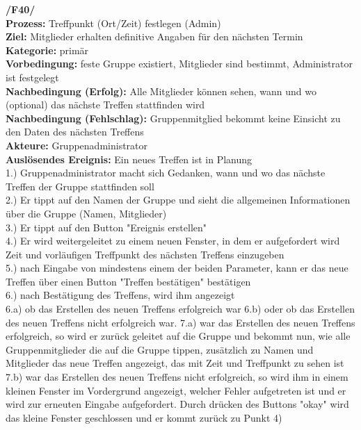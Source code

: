 \textbf{/F40/} \\
\textbf{Prozess:} Treffpunkt (Ort/Zeit) festlegen (Admin)\\
\textbf{Ziel:} Mitglieder erhalten definitive Angaben für den nächsten Termin\\
\textbf{Kategorie:} primär\\
\textbf{Vorbedingung:} feste Gruppe existiert, Mitglieder sind bestimmt, Administrator ist festgelegt\\
\textbf{Nachbedingung (Erfolg):} Alle Mitglieder können sehen, wann und wo (optional) das nächste Treffen stattfinden wird\\
\textbf{Nachbedingung (Fehlschlag):} Gruppenmitglied bekommt keine Einsicht zu den Daten des nächsten Treffens\\
\textbf{Akteure:} Gruppenadministrator\\
\textbf{Auslösendes Ereignis:} Ein neues Treffen ist in Planung\\
1.) Gruppenadministrator macht sich Gedanken, wann und wo das nächste Treffen der Gruppe stattfinden soll\\
2.) Er tippt auf den Namen der Gruppe und sieht die allgemeinen Informationen über die Gruppe (Namen, Mitglieder)\\
3.) Er tippt auf den Button "Ereignis erstellen"\\
4.) Er wird weitergeleitet zu einem neuen Fenster, in dem er aufgefordert wird Zeit und vorläufigen Treffpunkt des nächsten Treffens einzugeben\\
5.) nach Eingabe von mindestens einem der beiden Parameter, kann er das neue Treffen über einen Button "Treffen bestätigen" bestätigen\\
6.) nach Bestätigung des Treffens, wird ihm angezeigt\\
6.a) ob das Erstellen des neuen Treffens erfolgreich war
6.b) oder ob das Erstellen des neuen Treffens nicht erfolgreich war.
7.a) war das Erstellen des neuen Treffens erfolgreich, so wird er zurück geleitet auf die Gruppe und bekommt nun, wie alle Gruppenmitglieder die auf die Gruppe tippen, zusätzlich zu Namen und Mitglieder das neue Treffen angezeigt, das mit Zeit und Treffpunkt zu sehen ist\\
7.b) war das Erstellen des neuen Treffens nicht erfolgreich, so wird ihm in einem kleinen Fenster im Vordergrund angezeigt, welcher Fehler aufgetreten ist und er wird zur erneuten Eingabe aufgefordert. Durch drücken des Buttons "okay" wird das kleine Fenster geschlossen und er kommt zurück zu Punkt 4)\\ \\

